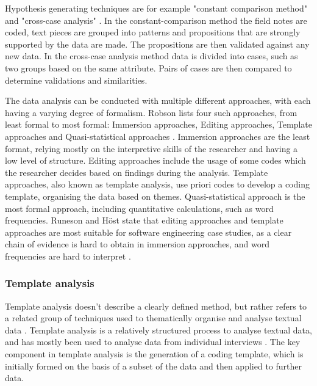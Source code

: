 \documentclass[english, grading]{tktltiki2}
\theoremstyle{definition}
\theoremstyle{remark}
\begin{document}
Hypothesis generating techniques are for example "constant comparison method" and "cross-case analysis" \cite{seaman1999qualitative}. In the constant-comparison method the field notes are coded, text pieces are grouped into patterns and propositions that are strongly supported by the data are made. The propositions are then validated against any new data. In the cross-case analysis method data is divided into cases, such as two groups based on the same attribute. Pairs of cases are then compared to determine validations and similarities. 

The data analysis can be conducted with multiple different approaches, with each having a varying degree of formalism. Robson lists four such approaches, from least formal to most formal: Immersion approaches, Editing approaches, Template approaches and Quasi-statistical approaches \cite{robson2002real}. Immersion approaches are the least format, relying mostly on the interpretive skills of the researcher and having a low level of structure. Editing approaches include the usage of some codes which the researcher decides based on findings during the analysis. Template approaches, also known as template analysis, use priori codes to develop a coding template, organising the data based on themes. Quasi-statistical approach is the most formal approach, including quantitative calculations, such as word frequencies. Runeson and Höst state that editing approaches and template approaches are most suitable for software engineering case studies, as a clear chain of evidence is hard to obtain in immersion approaches, and word frequencies are hard to interpret \cite{runeson2009guidelines}. 

\subsubsection{Template analysis}
Template analysis doesn't describe a clearly defined method, but rather refers to a related group of techniques used to thematically organise and analyse textual data \cite{king2004using}. Template analysis is a relatively structured process to analyse textual data, and has mostly been used to analyse data from individual interviews \cite{king2012doing}. The key component in template analysis is the generation of a coding template, which is initially formed on the basis of a subset of the data and then applied to further data. 
\end{document}
